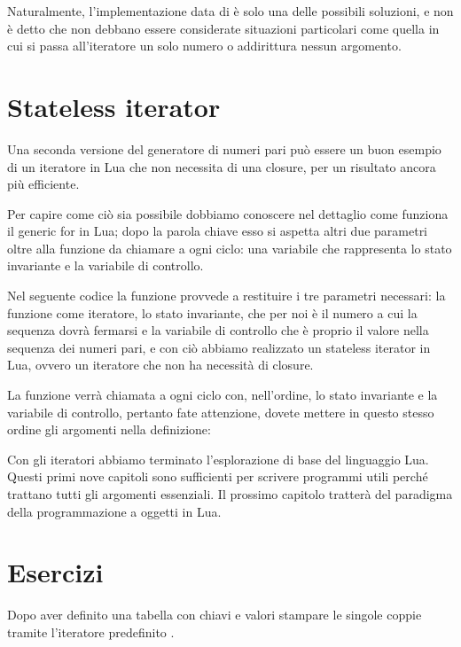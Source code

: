 Naturalmente, l'implementazione data di  è solo una delle possibili
soluzioni, e non è detto che non debbano essere considerate situazioni
particolari come quella in cui si passa all'iteratore un solo numero o
addirittura nessun argomento.


\section{Stateless iterator}

Una seconda versione del generatore di numeri pari può essere un buon esempio
di un iteratore in Lua che non necessita di una closure, per un risultato ancora
più efficiente.

Per capire come ciò sia possibile dobbiamo conoscere nel dettaglio come
funziona il generic for in Lua; dopo la parola chiave  esso si aspetta
altri due parametri oltre alla funzione da chiamare a ogni ciclo: una variabile
che rappresenta lo stato invariante e la variabile di controllo.

Nel seguente codice la funzione  provvede a restituire i tre
parametri necessari: la funzione  come iteratore, lo stato
invariante, che per noi è il numero a cui la sequenza dovrà fermarsi e la
variabile di controllo che è proprio il valore nella sequenza dei numeri pari,
e con ciò abbiamo realizzato un stateless iterator in Lua, ovvero un iteratore
che non ha necessità di closure.

La funzione  verrà chiamata a ogni ciclo con, nell'ordine, lo
stato invariante e la variabile di controllo, pertanto fate attenzione, dovete
mettere in questo stesso ordine gli argomenti nella definizione:

Con gli iteratori abbiamo terminato l'esplorazione di base del linguaggio Lua.
Questi primi nove capitoli sono sufficienti per scrivere programmi utili perché
trattano tutti gli argomenti essenziali. Il prossimo capitolo tratterà del
paradigma della programmazione a oggetti in Lua.


\section{Esercizi}

\begin{Exercise}[label=iter-01]
Dopo aver definito una tabella con chiavi e valori stampare le singole coppie
tramite l'iteratore predefinito .
\end{Exercise}

